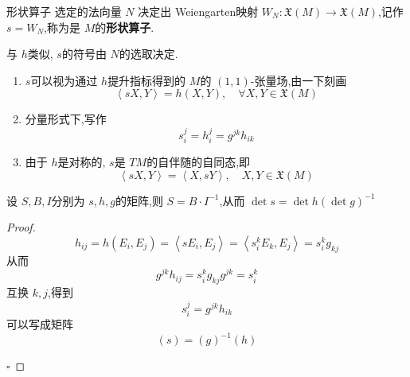 \documentclass[../../几何与拓扑.tex]{subfiles}
\begin{document}
\begin{definition}{形状算子}
    选定的法向量 \(  N  \) 决定出 Weiengarten映射 \(  W_{N}: \mathfrak{X}\left( M \right)\to \mathfrak{X}\left( M \right)    \),记作 \(  s = W_{N}  \),称为是 \(  M  \)的\textbf{形状算子}.   
\end{definition}

\begin{remark}
    与 \(  h  \)类似, \(  s  \)的符号由 \(  N  \)的选取决定.   
\end{remark}

\begin{proposition}
    \begin{enumerate}
        \item  \(  s  \)可以视为通过 \(  h  \)提升指标得到的 \(  M  \)的 \(  \left( 1,1 \right)   \)-张量场,由一下刻画 \[
        \left<sX,Y \right>= h\left( X,Y \right),\quad \forall X,Y \in \mathfrak{X}\left( M \right)  
        \]    
        \item 分量形式下,写作 \[
        s_{i}^{j}= h_{i}^{j}= g^{jk}h_{ik}
        \]
        \item 由于 \(  h  \)是对称的, \(  s  \)是 \(  TM  \)的自伴随的自同态,即 \[
        \left<sX,Y \right>= \left<X,sY \right>,\quad X,Y \in \mathfrak{X}\left( M \right) 
        \]   
    \end{enumerate}
    
\end{proposition}

\begin{remark}
    设 \(  S,B,I  \)分别为 \(  s, h, g  \)的矩阵,则 \(  S =  B\cdot I^{-1}   \),从而   \(  \det s= \det h \left( \det g \right)^{-1}    \) 
\end{remark}

\begin{proof}
    \[
   h_{ij}= h\left( E_{i},E_{j} \right)= \left<sE_{i},E_{j} \right>= \left<s_{i}^{k}E_{k},E_{j} \right>= s_{i}^{k}g_{kj} 
    \]从而 \[
        g^{jk} h_{ij}=  s_{i}^{k}g_{kj}g^{jk}= s_{i}^{k}
    \]互换 \(  k,j  \),得到 \[
    s_{i}^{j}=  g^{jk}h_{ik}
    \] 可以写成矩阵 \[
    \left( s \right)= \left( g \right)^{-1} \left( h \right)   
    \]

    \hfill $\square$
\end{proof}
\end{document}
